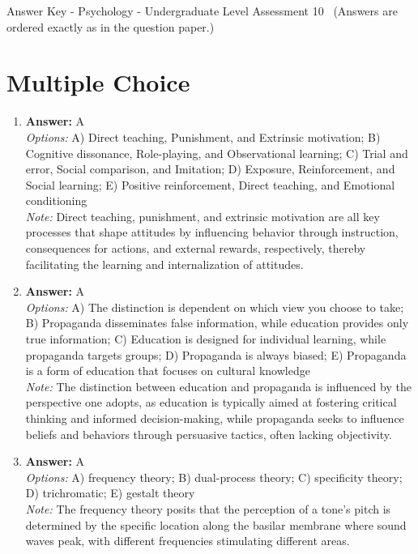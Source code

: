 \documentclass[12pt]{article}
\begin{document}
\begin{center}
Answer Key - Psychology - Undergraduate Level Assessment 10 \
\small (Answers are ordered exactly as in the question paper.)
\end{center}

\section*{Multiple Choice}
\begin{enumerate}[label=\arabic*.]
\item \textbf{Answer:} A
\\ \textit{Options:} A) Direct teaching, Punishment, and Extrinsic motivation; B) Cognitive dissonance, Role-playing, and Observational learning; C) Trial and error, Social comparison, and Imitation; D) Exposure, Reinforcement, and Social learning; E) Positive reinforcement, Direct teaching, and Emotional conditioning
\\ \textit{Note:} Direct teaching, punishment, and extrinsic motivation are all key processes that shape attitudes by influencing behavior through instruction, consequences for actions, and external rewards, respectively, thereby facilitating the learning and internalization of attitudes.
\item \textbf{Answer:} A
\\ \textit{Options:} A) The distinction is dependent on which view you choose to take; B) Propaganda disseminates false information, while education provides only true information; C) Education is designed for individual learning, while propaganda targets groups; D) Propaganda is always biased; E) Propaganda is a form of education that focuses on cultural knowledge
\\ \textit{Note:} The distinction between education and propaganda is influenced by the perspective one adopts, as education is typically aimed at fostering critical thinking and informed decision-making, while propaganda seeks to influence beliefs and behaviors through persuasive tactics, often lacking objectivity.
\item \textbf{Answer:} A
\\ \textit{Options:} A) frequency theory; B) dual-process theory; C) specificity theory; D) trichromatic; E) gestalt theory
\\ \textit{Note:} The frequency theory posits that the perception of a tone's pitch is determined by the specific location along the basilar membrane where sound waves peak, with different frequencies stimulating different areas.

\end{enumerate}
\end{document}
